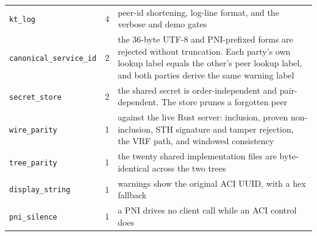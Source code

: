 \begin{table}[H]
\begin{tabular}{@{}ll>{\raggedright\arraybackslash}p{7.6cm}@{}}
\texttt{kt\_log} & 4 & peer-id shortening, log-line format, and the verbose and demo gates \\
\texttt{canonical\_service\_id} & 2 & the 36-byte UTF-8 and PNI-prefixed forms are rejected without truncation. Each party's own lookup label equals the other's peer lookup label, and both parties derive the same warning label \\
\texttt{secret\_store} & 2 & the shared secret is order-independent and pair-dependent. The store prunes a forgotten peer \\
\texttt{wire\_parity} & 1 & against the live Rust server: inclusion, proven non-inclusion, STH signature and tamper rejection, the VRF path, and windowed consistency \\
\texttt{tree\_parity} & 1 & the twenty shared implementation files are byte-identical across the two trees \\
\texttt{display\_string} & 1 & warnings show the original ACI UUID, with a hex fallback \\
\texttt{pni\_silence} & 1 & a PNI drives no client call while an ACI control does \\
\bottomrule
\end{tabular}
\end{table}

